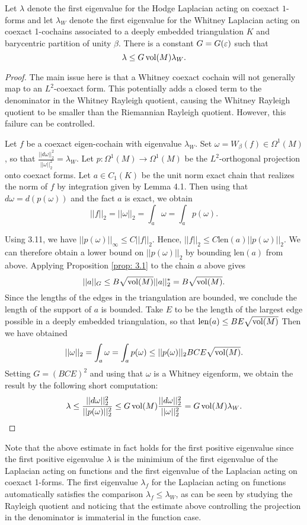 \begin{prop} \label{prop:4.2}
Let $\lambda$ denote the first eigenvalue for the Hodge Laplacian acting on coexact $1$-forms and let $\lambda_W$ denote the first eigenvalue for the Whitney Laplacian acting on coexact 1-cochains associated to a deeply embedded triangulation $K$ and barycentric partition of unity $\beta$. There is a constant $G = G(\varepsilon)$ such that $$\lambda \leq G \operatorname{vol}(M)\lambda_W.$$
\end{prop}
\begin{proof}

The main issue here is that a Whitney coexact cochain will not generally map to an $L^2$-coexact form. This potentially adds a closed term to the denominator in the Whitney Rayleigh quotient, causing the Whitney Rayleigh quotient to be smaller than the Riemannian Rayleigh quotient. However, this failure can be controlled.

Let $f$ be a coexact eigen-cochain with eigenvalue $\lambda_W$. Set $\omega = W_{\beta}(f)\in\Omega^1(M)$, so that $\frac{||d\omega||_2^2}{||\omega||_2^2} = \lambda_W$. Let $p:\Omega^1(M)\to \Omega^1(M)$ be the $L^2$-orthogonal projection onto coexact forms. Let $a\in C_1(K)$ be the unit norm exact chain that realizes the norm of $f$ by integration given by Lemma 4.1. Then using that $d\omega = d(p(\omega))$ and the fact $a$ is exact, we obtain $$||f||_2 = ||\omega||_2 = \int_{a}\omega = \int_{a}p(\omega).$$

Using 3.11, we have $||p(\omega)||_{\infty}\leq C||f||_2.$ Hence, $||f||_2\leq C\text{len}(a)||p(\omega)||_2.$ We can therefore obtain a lower bound on $||p(\omega)||_2$ by bounding $\text{len}(a)$ from above. Applying Proposition \ref{prop: 3.1} to the chain $a$ above gives $$\mathcal ||a||_G\leq B \sqrt{\operatorname{vol}(M)} ||a||_2^* =  B \sqrt{\operatorname{vol}(M)}.$$ Since the lengths of the edges in the triangulation are bounded, we conclude the length of the support of $a$ is bounded.
Take $E$ to be the length of the largest edge possible in a deeply embedded triangulation, so that $\text{len}(a)\leq BE\sqrt{\operatorname{vol}(M)}$
Then we have obtained $$||\omega||_2 = \int_{a} \omega = \int_{a}p(\omega) \leq ||p(\omega)||_2  BCE\sqrt{\operatorname{vol}(M)}.$$ Setting $G = ( BCE)^2$ and using that $\omega$ is a Whitney eigenform, we obtain the result by the following short computation:
\[
 \lambda \leq \frac{||d\omega||_2^2}{||p(\omega)||_2^2}
 \leq G\operatorname{vol}(M)\frac{||d\omega||_2^2}{||\omega||_2^2}
 = G\operatorname{vol}(M)\lambda_W.
\]
\end{proof}

\begin{remark}
Note that the above estimate in fact holds for the first positive eigenvalue since the first positive eigenvalue $\lambda$ is the minimium of the first  eigenvalue of the Laplacian acting on functions and the first eigenvalue of the Laplacian acting on coexact 1-forms. The first eigenvalue $\lambda_f$ for the Laplacian acting on functions automatically satisfies the comparison $\lambda_f \leq \lambda_W$, as can be seen by studying the Rayleigh quotient and noticing that the estimate above controlling the projection in the denominator is immaterial in the function case.
\end{remark}


